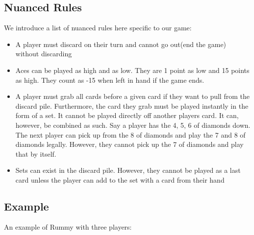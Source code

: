 \documentclass{article}
\begin{document}
\subsection{Nuanced Rules}
We introduce a list of nuanced rules here specific to our game:
\begin{itemize}
  \item A player must discard on their turn and cannot go out(end the game) without discarding
  \item Aces can be played as high and as low. They are 1 point as low and 15 points as high. They count as -15 when left in hand if the game ends.
  \item A player must grab all cards before a given card if they want to pull from the discard pile. Furthermore, the card they grab must be played instantly in the form of a set. It cannot be played directly off another players card. It can, however, be combined as such. Say a player has the 4, 5, 6 of diamonds down. The next player can pick up from the 8 of diamonds  and play the 7 and 8 of diamonds legally. However, they cannot pick up the 7 of diamonds and play that by itself.
  \item Sets can exist in the discard pile. However, they cannot be played as a last card unless the player can add to the set with a card from their hand
\end{itemize}

\subsection{Example}
An example of Rummy with three players:
\end{document}
